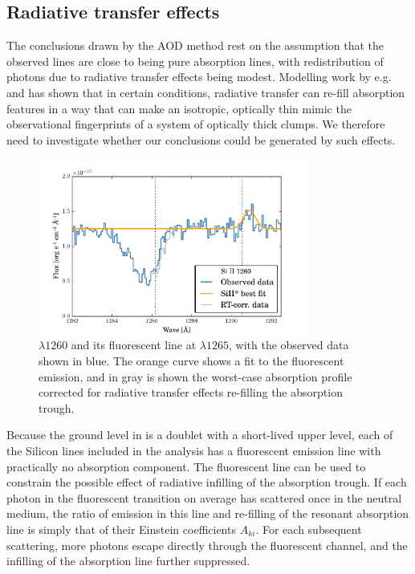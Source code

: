 \documentclass[twocolumn]{aastex61}
\begin{document}
\subsection{Radiative transfer effects}\label{sec:rt}

The conclusions drawn by the AOD method rest on the assumption that the
observed lines are close to being pure absorption lines, with
redistribution of photons due to radiative transfer effects being
modest. Modelling work by e.g. \citet{Prochaska2011} and
\citet{Scarlata2015} has shown that in certain conditions, radiative
transfer can re-fill absorption features in a way that can make an
isotropic, optically thin mimic the observational fingerprints of a
system of optically thick clumps. We therefore need to investigate
whether our conclusions could be generated by such effects.

\begin{figure}
\centering
\includegraphics[width=3.500in]{../Figs/1260-fit-fluor.pdf}
\caption{ $\lambda 1260$ and its fluorescent line at
$\lambda 1265$, with the observed data shown in blue. The orange curve
shows a fit to the fluorescent emission, and in gray is shown the
worst-case absorption profile corrected for radiative transfer effects
re-filling the absorption trough.}\label{fig:rt}
\end{figure}

Because the ground level in  is a doublet with a short-lived
upper level, each of the Silicon lines included in the analysis has a
fluorescent emission line with practically no absorption component. The
fluorescent line can be used to constrain the possible effect of
radiative infilling of the absorption trough. If each photon in the
fluorescent transition on average has scattered once in the neutral
medium, the ratio of emission in this line and re-filling of the
resonant absorption line is simply that of their Einstein coefficients
$A_{ki}$. For each subsequent scattering, more photons escape directly
through the fluorescent channel, and the infilling of the absorption
line further suppressed.
\end{document}

